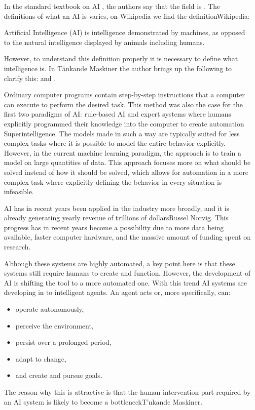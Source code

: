 \documentclass[12pt,A4]{report}
\newcommand{\autobaj}{}
\theoremstyle{definition}
\begin{document}
In the standard textbook on AI \autocite{RusselNorvig}, the authors say that the field is . The definitions of what an AI is varies, on Wikipedia we find the definition\autobaj{Wikipedia}:
\begin{displayquote}
Artificial Intelligence (AI) is intelligence demonstrated by machines, as opposed to the natural intelligence displayed by animals including humans.
\end{displayquote}
However, to understand this definition properly it is necessary to define what intelligence is. In \autobaj{Tänkande Maskiner} the author brings up the following to clarify this:  and . 

Ordinary computer programs contain step-by-step instructions that a computer can execute to perform the desired task. This method was also the case for the first two paradigms of AI: rule-based AI and expert systems where humans explicitly programmed their knowledge into the computer to create automation \autobaj{Superintelligence}. The models made in such a way are typically suited for less complex tasks where it is possible to model the entire behavior explicitly. However, in the current machine learning paradigm, the approach is to train a model on large quantities of data. This approach focuses more on what should be solved instead of how it should be solved, which allows for automation in a more complex task where explicitly defining the behavior in every situation is infeasible. 

AI has in recent years been applied in the industry more broadly, and it is already generating yearly revenue of trillions of dollars\autobaj{Russel Norvig}. This progress has in recent years become a possibility due to more data being available, faster computer hardware, and the massive amount of funding spent on research. 

Although these systems are highly automated, a key point here is that these systems still require humans to create and function. However, the development of AI is shifting the tool to a more automated one. With this trend AI systems are developing in to intelligent agents. An agent acts or, more specifically, can:
\begin{itemize}
  \item operate autonomously,
  \item perceive the environment,
  \item persist over a prolonged period,
  \item adapt to change,
  \item and create and pursue goals.
\end{itemize}
The reason why this is attractive is that the human intervention part required by an AI system is likely to become a bottleneck\autobaj{T'nkande Maskiner}. 
\end{document}
